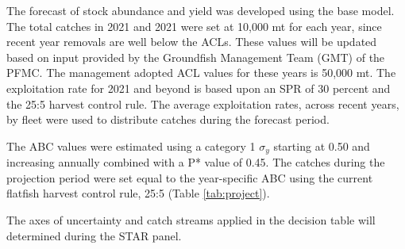 \documentclass[11pt,
  english,
  a4paper,
]{article}
\begin{document}
\leavevmode\tagmcend\tagstructend


The forecast of stock abundance and yield was developed using the base model. The total catches in 2021 and 2021 were set at 10,000 mt for each year, since recent year removals are well below the ACLs. These values will be updated based on input provided by the Groundfish Management Team (GMT) of the PFMC. The management adopted ACL values for these years is 50,000 mt. The exploitation rate for 2021 and beyond is based upon an SPR of 30 percent and the 25:5 harvest control rule. The average exploitation rates, across recent years, by fleet were used to distribute catches during the forecast period.

\leavevmode\tagmcend\tagstructend\par


The ABC values were estimated using a category 1 {\(\sigma_y\)\leavevmode\tagmcend\tagstructend} starting at 0.50 and increasing annually combined with a P* value of 0.45. The catches during the projection period were set equal to the year-specific ABC using the current flatfish harvest control rule, 25:5 (Table \ref{tab:project}).

\leavevmode\tagmcend\tagstructend\par


The axes of uncertainty and catch streams applied in the decision table will determined during the STAR panel.

\leavevmode\tagmcend\tagstructend\par

\begingroup\fontsize{10}{12}\selectfont
\end{document}
